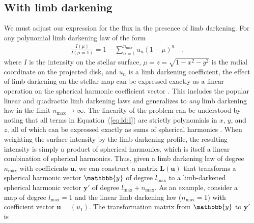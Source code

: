 \documentclass[modern]{aastex62}
\begin{document}
\subsection{With limb darkening}
%
\label{sec:ld}
We must adjust our expression for the flux in the presence of limb darkening.
For any polynomial limb darkening law of the form
%
\begin{align}
    \label{eq:ld:I}
    \frac{I(\mu)}{I(\mu = 1)} = 1 - \sum_{n=1}^{n_\mathrm{max}} u_n(1 - \mu)^n
    \quad,
\end{align}
%
where $I$ is the intensity on the stellar surface,
$\mu = z = \sqrt{1 - x^2 - y^2}$ is the radial coordinate on the
projected disk, and $u_n$ is a limb darkening coefficient, the effect of
limb darkening on the stellar map can be expressed exactly as a linear
operation on the spherical harmonic coefficient vector
\citep{Luger2019}.
This includes the popular linear and quadractic limb darkening laws
and generalizes to \emph{any} limb darkening law in the limit
$n_\mathrm{max} \rightarrow \infty$. The linearity of the problem
can be understood by noting that all terms
in Equation~(\ref{eq:ld:I}) are strictly polynomials in $x$, $y$, and $z$,
all of which can be expressed exactly as sums of spherical harmonics
\citep{Luger2019}. When weighting the surface intensity by the limb darkening
profile, the resulting intensity is simply a product of spherical harmonics,
which is itself a linear combination of spherical harmonics.
Thus, given a limb darkening law
of degree $n_\mathrm{max}$ with coefficients $\mathbf{u}$,
we can construct a matrix $\mathbf{L}(\mathbf{u})$
that transforms a spherical harmonic vector $\mathbbb{y}$ of degree
$l_\mathrm{max}$ to a limb-darkened spherical harmonic vector $\mathbf{y'}$
of degree $l_\mathrm{max} + n_\mathrm{max}$. As an example, consider
a map of degree $l_\mathrm{max} = 1$ and the linear limb darkening law
($n_\mathrm{max} = 1$) with coefficient vector $\mathbf{u} = ( u_1 )$.
The transformation matrix from $\mathbbb{y}$ to $\mathbf{y'}$ is
%
\end{document}
